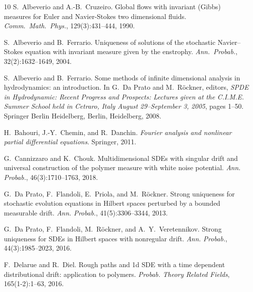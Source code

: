 \documentclass[10pt]{article}
\newcommand{\tmtextit}[1]{{\itshape{#1}}}
\begin{document}
\begin{thebibliography}{10}
  S.~Albeverio  and  A.-B.~Cruzeiro.
  {\newblock}Global flows with invariant (Gibbs) measures for Euler and
  Navier-Stokes two dimensional fluids.
  {\newblock}\tmtextit{Comm.~Math.~Phys.}, 129(3):431--444, 1990.{\newblock}
  
  S.~Albeverio  and  B.~Ferrario.
  {\newblock}Uniqueness of solutions of the stochastic Navier--Stokes equation
  with invariant measure given by the enstrophy.
  {\newblock}\tmtextit{Ann.~Probab.}, 32(2):1632--1649, 2004.{\newblock}
  
  S.~Albeverio  and  B.~Ferrario.
  {\newblock}Some methods of infinite dimensional analysis in hydrodynamics:
  an introduction. {\newblock}In  G.~Da Prato  and  M.~R{\"o}ckner, editors,
  \tmtextit{SPDE in Hydrodynamic: Recent Progress and Prospects: Lectures
  given at the C.I.M.E. Summer School held in Cetraro, Italy August
  29--September 3, 2005},  pages  1--50. Springer Berlin Heidelberg, Berlin,
  Heidelberg, 2008.{\newblock}
  
  H.~Bahouri, J.-Y.~Chemin, and  R.~Danchin.
  {\newblock}\tmtextit{Fourier analysis and nonlinear partial differential
  equations}. {\newblock}Springer, 2011.{\newblock}
  
  G.~Cannizzaro  and  K.~Chouk.
  {\newblock}Multidimensional SDEs with singular drift and universal
  construction of the polymer measure with white noise potential.
  {\newblock}\tmtextit{Ann. Probab.}, 46(3):1710--1763, 2018.{\newblock}
  
  G.~Da Prato, F.~Flandoli, E.~Priola, and 
  M.~R{\"o}ckner. {\newblock}Strong uniqueness for stochastic evolution
  equations in Hilbert spaces perturbed by a bounded measurable drift.
  {\newblock}\tmtextit{Ann. Probab.}, 41(5):3306--3344, 2013.{\newblock}
  
  G.~Da Prato, F.~Flandoli, M.~R{\"o}ckner, and 
  A.~Y.~Veretennikov. {\newblock}Strong uniqueness for SDEs in Hilbert spaces
  with nonregular drift. {\newblock}\tmtextit{Ann. Probab.}, 44(3):1985--2023,
  2016.{\newblock}
  
  F.~Delarue  and  R.~Diel. {\newblock}Rough paths and
  1d SDE with a time dependent distributional drift: application to polymers.
  {\newblock}\tmtextit{Probab. Theory Related Fields}, 165(1-2):1--63,
  2016.{\newblock}
  

\end{thebibliography}
\end{document}
